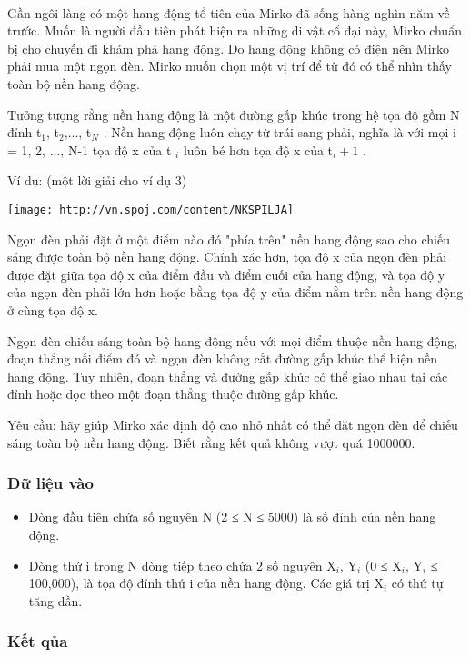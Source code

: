 

 

Gần ngôi làng có một hang động tổ tiên của Mirko đã sống hàng nghìn năm về trước. Muốn là người đầu tiên phát hiện ra những di vật cổ đại này, Mirko chuẩn bị cho chuyến đi khám phá hang động. Do hang động không có điện nên Mirko phải mua một ngọn đèn. Mirko muốn chọn một vị trí để từ đó có thể nhìn thấy toàn bộ nền hang động.

Tưởng tượng rằng nền hang động là một đường gấp khúc trong hệ tọa độ gồm N đỉnh t$_1$, t$_2$,..., t$_N $ . Nền hang động luôn chạy từ trái sang phải, nghĩa là với mọi i = 1, 2, ..., N-1 tọa độ x của t $_ i $ luôn bé hơn tọa độ x của t$_i+1 $ .

Ví dụ: (một lời giải cho ví dụ 3)


\texttt{[image: http://vn.spoj.com/content/NKSPILJA]}

Ngọn đèn phải đặt ở một điểm nào đó "phía trên" nền hang động sao cho chiếu sáng được toàn bộ nền hang động. Chính xác hơn, tọa độ x của ngọn đèn phải được đặt giữa tọa độ x của điểm đầu và điểm cuối của hang động, và tọa độ y của ngọn đèn phải lớn hơn hoặc bằng tọa độ y của điểm nằm trên nền hang động ở cùng tọa độ x.

Ngọn đèn chiếu sáng toàn bộ hang động nếu với mọi điểm thuộc nền hang động, đoạn thẳng nối điểm đó và ngọn đèn không cắt đường gấp khúc thể hiện nền hang động. Tuy nhiên, đoạn thẳng và đường gấp khúc có thể giao nhau tại các đỉnh hoặc dọc theo một đoạn thẳng thuộc đường gấp khúc.

Yêu cầu: hãy giúp Mirko xác định độ cao nhỏ nhất có thể đặt ngọn đèn để chiếu sáng toàn bộ nền hang động. Biết rằng kết quả không vượt quá 1000000.

\subsubsection{Dữ liệu vào}
\begin{itemize}
	\item Dòng đầu tiên chứa số nguyên N (2 ≤ N ≤ 5000) là số đỉnh của nền hang động.
	\item Dòng thứ i trong N dòng tiếp theo chứa 2 số nguyên X$_i$, Y$_i $ (0 ≤ X$_i$, Y$_i $ ≤ 100,000), là tọa độ đỉnh thứ i của nền hang động. Các giá trị X$_i $ có thứ tự tăng dần.
\end{itemize}

\subsubsection{Kết qủa}

